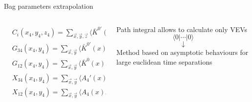 \documentclass{beamer}
\newcommand{\la}{\langle}
\newcommand{\ra}{\rangle}
\begin{document}
\begin{frame}{Bag parameters extrapolation}
      \begin{columns}
            \begin{column}{0.5\textwidth}
                  \begin{equation*}
                        \begin{split}
                              & C_i (x_4,y_4,z_4) = \sum_{\vec x,\vec y,\vec z}     \la \bar K^{0'}(x)O_{i[+]}(y)\bar K^{0} (z) \ra  \\
                              & G_{34} (x_4,y_4) = \sum_{\vec x,\vec y}             \la \bar K^{0'} (x) K^{0'} (y)              \ra \\
                              & G_{12} (x_4,y_4) = \sum_{\vec x,\vec y}             \la \bar K^{0} (x) K^{0} (y)                \ra \\
                              & X_{34} (x_4,y_4) = \sum_{\vec x,\vec y}             \la      A_{4}' (x) K^{0'} (y)              \ra \\
                              & X_{12} (x_4,y_4) = \sum_{\vec x,\vec y}             \la      A_{4} (x) K^{0} (y)                \ra \\          
                        \end{split}
                  \end{equation*}
            \end{column}
            \begin{column}{0.5\textwidth}
                  \begin{center}
                        Path integral allows to calculate only VEVs$$\la 0 | \cdots | 0 \ra$$
                        $$\downarrow$$
                        Method based on asymptotic behaviours for large euclidean time separations
                  \end{center}
            \end{column}
      \end{columns}
\end{frame}
\end{document}
